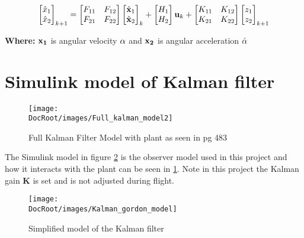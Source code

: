  
\begin{equation}
	\begin{bmatrix}																
		\hat{x}_1		         			\\
		\hat{ x}_2		
		\end{bmatrix}_{k+1}
		=
	\begin{bmatrix}
		F_{11}	& F_{12 } \\
		F_{21}	& F_{22}
		\end{bmatrix}
			\begin{bmatrix}											
			\hat{\bf x}_1		         			\\
			\hat{\bf x}_2		
			\end{bmatrix}_{k}	
			+
	\begin{bmatrix}
	H_1 \\
	H_2
	\end{bmatrix}
	{\bf u}_k
	+
	\begin{bmatrix}
	K_{11}	& K_{12 } \\
	K_{21}	& K_{22}
	\end{bmatrix}
	\begin{bmatrix}											
	{ z}_1		         			\\
	{z}_2		
	\end{bmatrix}_{k+1}	
\end{equation}

{\bf Where:} ${\bf x_1}$ is angular velocity ${\bf \alpha}$ and ${\bf x_2}$ is angular acceleration $\dot{\bf \alpha}$  

\newpage
 \tocless\section{Simulink model of Kalman filter}
\begin{figure}[h]
	\centering
	\texttt{[image: \\DocRoot/images/Full\_kalman\_model2]}
	\caption{Full Kalman Filter Model with plant as seen in \cite{Artofcontrol} pg 483}
	\label{fig: Kalman model}
\end{figure}

The Simulink model in figure \ref{fig: kalman used in project} is the observer model used in this project and how it interacts with the plant can be seen in \ref{fig: Kalman model}. Note in this project the Kalman gain {\bf K} is set and is not adjusted during flight.

\begin{figure}[h]
	\centering
	\texttt{[image: \\DocRoot/images/Kalman\_gordon\_model]}
	\caption{Simplified model of the Kalman filter}
	\label {fig: kalman used in project}
\end{figure}
